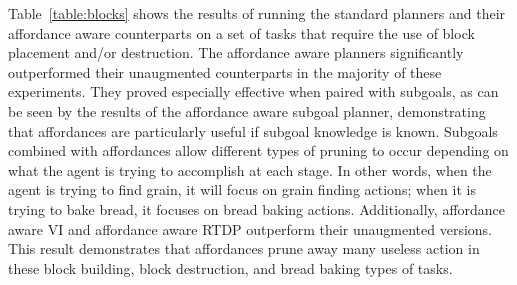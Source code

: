 \documentclass[]{article}
\begin{document}

%
%


Table~\ref{table:blocks} shows the results of running the standard
planners and their affordance aware counterparts on a set of tasks
that require the use of block placement and/or destruction.  The
affordance aware planners significantly outperformed their unaugmented
counterparts in the majority of these experiments. They proved
especially effective when paired with subgoals, as can be seen by the
results of the affordance aware subgoal planner, demonstrating that
affordances are particularly useful if subgoal knowledge is known.
Subgoals combined with affordances allow different types of pruning to
occur depending on what the agent is trying to accomplish at each
stage. In other words, when the agent is trying to find grain, it will
focus on grain finding actions; when it is trying to bake bread, it
focuses on bread baking actions.  Additionally, affordance aware VI
and affordance aware RTDP outperform their unaugmented versions.  This
result demonstrates that affordances prune away many useless action in
these block building, block destruction, and bread baking types of
tasks.
\end{document}
